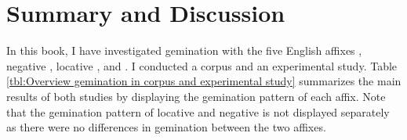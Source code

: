 \chapter{Summary and Discussion} \label{Conclusion}

In this book, I have investigated gemination with the five English affixes , negative , locative ,  and . I conducted a corpus and an experimental study. 
Table \ref{tbl:Overview gemination in corpus and experimental study} summarizes the main results of both studies by displaying the gemination pattern of each affix. Note that the gemination pattern of locative and negative  is not displayed separately as there were no differences in gemination between the two affixes. 





\begin{table*}[b!]
	\caption{Overview of gemination in corpus and experimental study}
	\label{tbl:Overview gemination in corpus and experimental study}
	
	\begin{center}
\vspace*{-0.2cm}
		\renewcommand{\arraystretch}{1.5}
	\end{center}
\vspace*{-0.5cm}
\end{table*}


